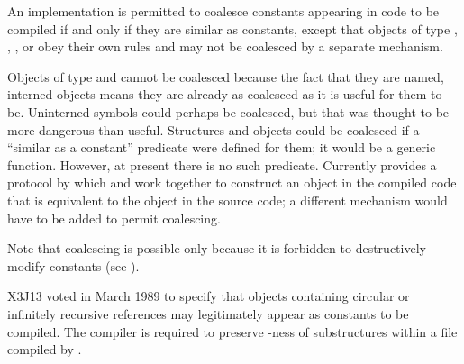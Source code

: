 \begin{newer}
An implementation is permitted to coalesce constants
appearing in code to be compiled if and only if they are similar as
constants, except that objects of type , ,
, or  obey their own rules
and may not be coalesced by a separate mechanism.

\beforenoterule
\begin{rationale}
Objects of type  and  cannot be coalesced because the fact
that they are named, interned objects means they are already as
coalesced as it is useful for them to be.  Uninterned symbols could
perhaps be coalesced, but that was thought to be more dangerous than
useful.  Structures and objects could be
coalesced if a ``similar as a constant'' predicate were defined for them;
it would be a generic function.  However, at present there is no such
predicate.  Currently  provides a protocol by which
 and  work together to construct an object in the
compiled code that is equivalent to the object in the source code;
a different mechanism would have to be added to permit coalescing.
\end{rationale}
\afternoterule

Note that coalescing is possible only because it is forbidden to
destructively modify constants  (see ).

   X3J13 voted in March 1989  to specify
that objects containing circular or infinitely recursive references may legitimately
appear as constants to be compiled.  The compiler is
required to preserve -ness of substructures within a file compiled
by .
\end{newer}

